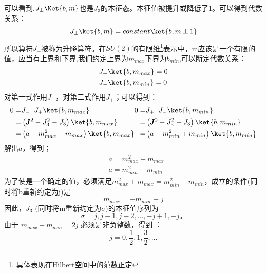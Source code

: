 可以看到,$J_{\pm}\Ket{b,m}$也是$J_3$的本征态。本征值被提升或降低了1。可以得到代数关系：
\begin{equation}
    J_\pm\ket{b,m} =constant \ket{b,m \pm 1}
\end{equation}
所以算符$J_{\pm}$被称为升降算符。在$SU(2)$的有限维\footnote{具体表现在Hilbert空间中的范数正定}表示中，m应该是一个有限的值，应当有上界和下界,我们约定上界为$m_{max}$下界为$b_{min}$,可以断定代数关系：
\begin{subequations}
    \begin{align}
        &J_+\ket{b,m_{max}}=0\\
        &J_-\ket{b,m_{min}}=0
    \end{align}
\end{subequations}
对第一式作用$J_-$，对第二式作用$J_+$；可以得到：
\begin{equation}
    \begin{aligned}
    0=&J_-\;\;J_+\ket{b,m_{max}}\\
    =& \left(\pmb{J}^2 - J_3^2 - J_3\right)\ket{b,m_{max}}\\  
    =& \left(a - m_{max}^2 - m_{max}\right)\ket{b,m_{max}}  
    \end{aligned}
    \\
    \begin{aligned}
        0=&J_+\;\;J_-\ket{b,m_{min}}\\
        =& \left(\pmb{J}^2 - J_3^2 +J_3\right)\ket{b,m_{min}}\\  
        =& \left(a - m_{min}^2 + m_{min}\right)\ket{b,m_{min}}  
    \end{aligned}
\end{equation}
解出$a$，得到；
\[\begin{aligned}
    &a=m_{max}^2 + m_{max}\\
    &a=m_{min}^2 - m_{min}
\end{aligned}\]
为了使是一个确定的值，必须满足$m_{max}^2 + m_{max} = m_{min}^2 - m_{min}$，成立的条件(同时将b重新约定为j)是
\begin{equation}
    m_{max} = -m_{min} \equiv j
\end{equation}
因此，$J_3$ (同时将m重新约定为$\sigma$)的本征值序列为 
\begin{equation}
    \sigma=j, j-1, j-2, \ldots, -j+1, -j。
\end{equation}
由于 $m_{max} - m_{min} = 2j$ 必须是非负整数，得到 ：
\begin{equation}
    j = 0, \frac{1}{2}, 1, \frac{3}{2}, \ldots
\end{equation}
